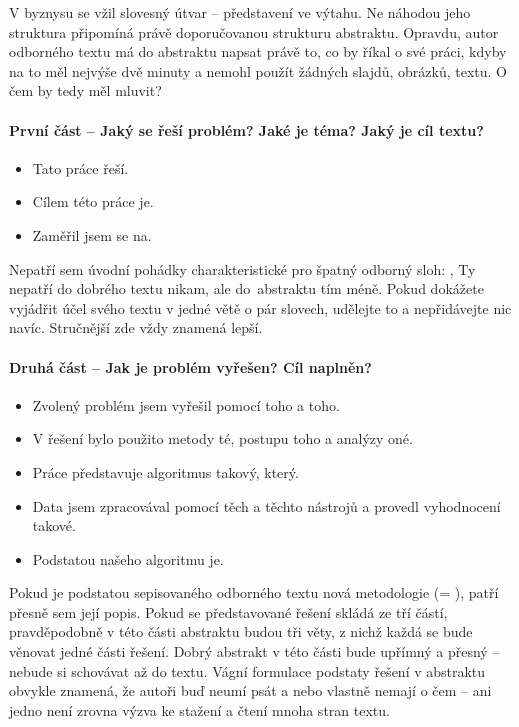 V byznysu se vžil slovesný útvar  -- představení ve výtahu. Ne náhodou jeho struktura připomíná právě doporučovanou strukturu abstraktu. Opravdu, autor odborného textu má do abstraktu napsat právě to, co by říkal o své práci, kdyby na to měl nejvýše dvě minuty a nemohl použít žádných slajdů, obrázků, textu. O čem by tedy měl mluvit?

\paragraph{První část -- Jaký se řeší problém? Jaké je téma? Jaký je cíl textu?}
\begin{itemize}
  \item{Tato práce řeší.}
  \item{Cílem této práce je.}
  \item{Zaměřil jsem se na.}
\end{itemize}
Nepatří sem úvodní pohádky charakteristické pro špatný odborný sloh: ,  Ty nepatří do dobrého textu nikam, ale do~abstraktu tím méně. Pokud dokážete vyjádřit účel svého textu v jedné větě o pár slovech, udělejte to a nepřidávejte nic navíc. Stručnější zde vždy znamená lepší.

\paragraph{Druhá část -- Jak je problém vyřešen? Cíl naplněn?}
\begin{itemize}
  \item{Zvolený problém jsem vyřešil pomocí toho a toho.}
  \item{V řešení bylo použito metody té, postupu toho a analýzy oné.}
  \item{Práce představuje algoritmus takový, který.}
  \item{Data jsem zpracovával pomocí těch a těchto nástrojů a provedl vyhodnocení takové.}
  \item{Podstatou našeho algoritmu je.}
\end{itemize}

Pokud je podstatou sepisovaného odborného textu nová metodologie (= ), patří přesně sem její popis. Pokud se představované řešení skládá ze tří částí, pravděpodobně v této části abstraktu budou tři věty, z nichž každá se bude věnovat jedné části řešení. Dobrý abstrakt v této části bude upřímný a přesný -- nebude si schovávat  až do textu. Vágní formulace podstaty řešení v abstraktu obvykle znamená, že autoři buď neumí psát a nebo vlastně nemají o čem -- ani jedno není zrovna výzva ke stažení a čtení mnoha stran textu.

